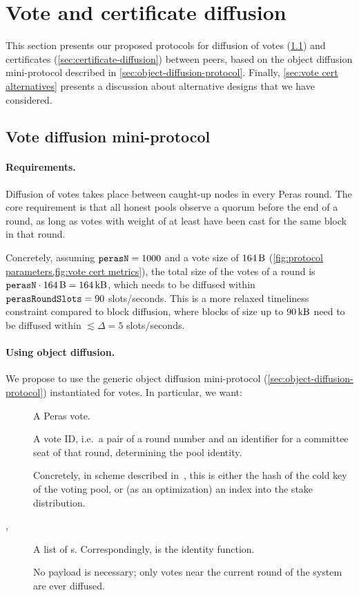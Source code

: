 \section{Vote and certificate diffusion}%
\label{sec:certificate-vote-diffusion}

This section presents our proposed protocols for diffusion of votes (\cref{sec:vote-diffusion}) and certificates (\cref{sec:certificate-diffusion}) between peers, based on the object diffusion mini-protocol described in \cref{sec:object-diffusion-protocol}.
Finally, \cref{sec:vote cert alternatives} presents a discussion about alternative designs that we have considered.

\subsection{Vote diffusion mini-protocol}%
\label{sec:vote-diffusion}

\paragraph{Requirements.}
Diffusion of votes takes place between caught-up nodes in every Peras round.
The core requirement is that all honest pools observe a quorum before the end of a round, as long as votes with weight of at least \perasQuorum{} have been cast for the same block in that round.

Concretely, assuming $\mathtt{perasN} = 1000$ and a vote size of $\qty{164}{\byte}$ (\cref{fig:protocol parameters,fig:vote cert metrics}), the total size of the votes of a round is $\perasN \cdot \qty{164}{\byte} = \qty{164}{\kilo\byte}$, which needs to be diffused within $\mathtt{perasRoundSlots} = 90$ slots/seconds.
This is a more relaxed timeliness constraint compared to block diffusion, where blocks of size up to $\qty{90}{\kilo\byte}$ need to be diffused within $\lesssim \Delta = 5$ slots/seconds.

\paragraph{Using object diffusion.}

We propose to use the generic object diffusion mini-protocol (\cref{sec:object-diffusion-protocol}) instantiated for votes.
In particular, we want:
%
\begin{description}
\item[]
  A Peras vote.
\item[]
  A vote ID, i.e.\ a pair of a round number and an identifier for a committee seat of that round, determining the pool identity.

  Concretely, in scheme described in~\cite{peras-cert-report}, this is either the hash of the cold key of the voting pool, or (as an optimization) an index into the stake distribution.
\item[, ]
  A list of s. Correspondingly,  is the identity function.
\item[]
  No payload is necessary; only votes near the current round of the system are ever diffused.
\end{description}

